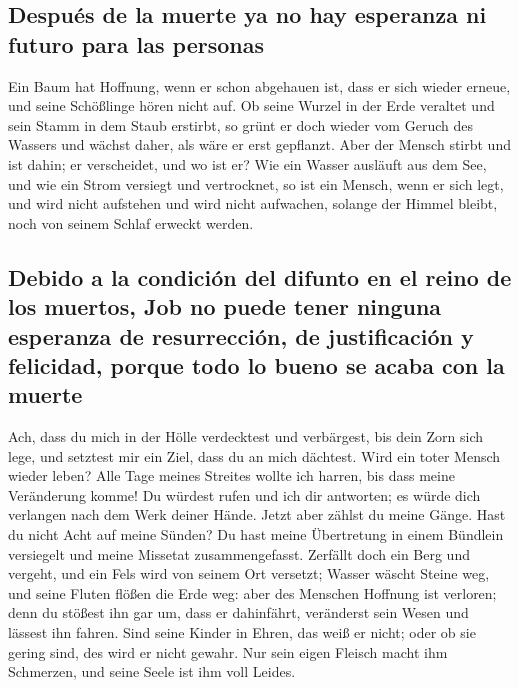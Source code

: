 \hypertarget{despuuxe9s-de-la-muerte-ya-no-hay-esperanza-ni-futuro-para-las-personas}{%
\subsection{Después de la muerte ya no hay esperanza ni futuro para las
personas}\label{despuuxe9s-de-la-muerte-ya-no-hay-esperanza-ni-futuro-para-las-personas}}

 Ein Baum hat Hoffnung, wenn er schon abgehauen ist, dass
er sich wieder erneue, und seine Schößlinge hören nicht auf.
 Ob seine Wurzel in der Erde veraltet und sein Stamm in
dem Staub erstirbt,  so grünt er doch wieder vom Geruch
des Wassers und wächst daher, als wäre er erst gepflanzt.
 Aber der Mensch stirbt und ist dahin; er verscheidet,
und wo ist er?  Wie ein Wasser ausläuft aus dem See, und
wie ein Strom versiegt und vertrocknet,  so ist ein
Mensch, wenn er sich legt, und wird nicht aufstehen und wird nicht
aufwachen, solange der Himmel bleibt, noch von seinem Schlaf erweckt
werden.

\hypertarget{debido-a-la-condiciuxf3n-del-difunto-en-el-reino-de-los-muertos-job-no-puede-tener-ninguna-esperanza-de-resurrecciuxf3n-de-justificaciuxf3n-y-felicidad-porque-todo-lo-bueno-se-acaba-con-la-muerte}{%
\subsection{Debido a la condición del difunto en el reino de los
muertos, Job no puede tener ninguna esperanza de resurrección, de
justificación y felicidad, porque todo lo bueno se acaba con la
muerte}\label{debido-a-la-condiciuxf3n-del-difunto-en-el-reino-de-los-muertos-job-no-puede-tener-ninguna-esperanza-de-resurrecciuxf3n-de-justificaciuxf3n-y-felicidad-porque-todo-lo-bueno-se-acaba-con-la-muerte}}

 Ach, dass du mich in der Hölle verdecktest und
verbärgest, bis dein Zorn sich lege, und setztest mir ein Ziel, dass du
an mich dächtest.  Wird ein toter Mensch wieder leben?
Alle Tage meines Streites wollte ich harren, bis dass meine Veränderung
komme!  Du würdest rufen und ich dir antworten; es würde
dich verlangen nach dem Werk deiner Hände.  Jetzt aber
zählst du meine Gänge. Hast du nicht Acht auf meine Sünden?
 Du hast meine Übertretung in einem Bündlein versiegelt
und meine Missetat zusammengefasst.  Zerfällt doch ein
Berg und vergeht, und ein Fels wird von seinem Ort versetzt;
 Wasser wäscht Steine weg, und seine Fluten flößen die
Erde weg: aber des Menschen Hoffnung ist verloren;  denn
du stößest ihn gar um, dass er dahinfährt, veränderst sein Wesen und
lässest ihn fahren.  Sind seine Kinder in Ehren, das weiß
er nicht; oder ob sie gering sind, des wird er nicht gewahr.
 Nur sein eigen Fleisch macht ihm Schmerzen, und seine
Seele ist ihm voll Leides.

